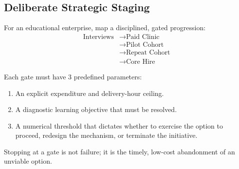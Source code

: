 \subsection{Deliberate Strategic Staging}

For an educational enterprise, map a disciplined, gated progression:
\begin{equation*}
\begin{aligned}
\text{Interviews} &\longrightarrow \text{Paid Clinic} \\
&\longrightarrow \text{Pilot Cohort} \\
&\longrightarrow \text{Repeat Cohort} \\
&\longrightarrow \text{Core Hire}
\end{aligned}
\end{equation*}

Each gate must have 3 predefined parameters:
\begin{enumerate}[leftmargin=12pt,itemsep=1pt,topsep=1pt,parsep=0pt]
  \item An explicit expenditure and delivery-hour ceiling.
  \item A diagnostic learning objective that must be resolved.
  \item A numerical threshold that dictates whether to exercise the option to proceed, redesign the mechanism, or terminate the initiative.
\end{enumerate}

Stopping at a gate is not failure; it is the timely, low-cost abandonment of an unviable option.

